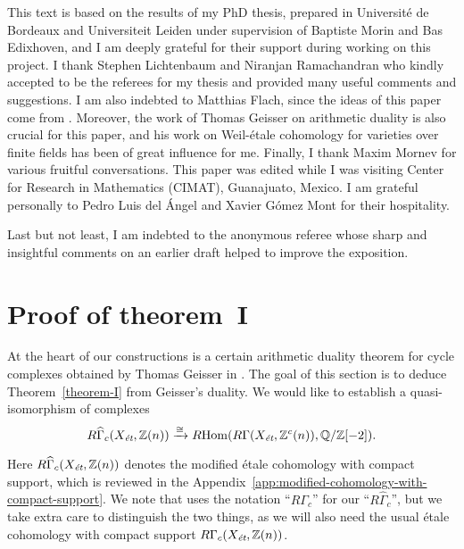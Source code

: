 \documentclass[leqno,12pt]{article}
\theoremstyle{plain}
\theoremstyle{definition}
\DeclareMathOperator{\Hom}{Hom}
\newcommand{\QQ}{\mathbb{Q}}
\newcommand{\ZZ}{\mathbb{Z}}
\newcommand{\et}{\text{\it \'{e}t}}
\newcommand{\RHom}{R\!\Hom}
\begin{document}
This text is based on the results of my PhD thesis, prepared in Universit\'{e}
de Bordeaux and Universiteit Leiden under supervision of Baptiste Morin and
Bas Edixhoven, and I am deeply grateful for their support during working on this
project. I thank Stephen Lichtenbaum and Niranjan Ramachandran who kindly
accepted to be the referees for my thesis and provided many useful comments and
suggestions. I am also indebted to Matthias Flach, since the ideas of this paper
come from \cite{Flach-Morin-2018}. Moreover, the work of Thomas Geisser on
arithmetic duality \cite{Geisser-2010} is also crucial for this paper, and his
work on Weil-\'{e}tale cohomology for varieties over finite fields
\cite{Geisser-2004,Geisser-2006,Geisser-2010-arithmetic-homology} has been of
great influence for me. Finally, I thank Maxim Mornev for various fruitful
conversations. This paper was edited while I was visiting Center for Research in
Mathematics (CIMAT), Guanajuato, Mexico. I am grateful personally to Pedro Luis
del \'{A}ngel and Xavier G\'{o}mez Mont for their hospitality.

Last but not least, I am indebted to the anonymous referee whose sharp and
insightful comments on an earlier draft helped to improve the exposition.


\section{Proof of theorem~I}
\label{sec:arithmetic-duality-theorem}

At the heart of our constructions is a certain arithmetic duality theorem for
cycle complexes obtained by Thomas Geisser in \cite{Geisser-2010}. The goal of
this section is to deduce Theorem~\ref{theorem-I} from Geisser's duality.
We would like to establish a quasi-isomorphism of complexes
\[ R\widehat{\Gamma}_c (X_\et, \ZZ (n)) \xrightarrow{\cong}
\RHom (R\Gamma (X_\et, \ZZ^c (n)), \QQ/\ZZ [-2]). \]

Here $R\widehat{\Gamma}_c (X_\et, \ZZ (n))$ denotes the modified \'{e}tale
cohomology with compact support, which is reviewed in the
Appendix~\ref{app:modified-cohomology-with-compact-support}. We note that
\cite{Geisser-2010} uses the notation ``$R\Gamma_c$'' for our
``$R\widehat{\Gamma}_c$'', but we take extra care to distinguish the two things,
as we will also need the usual \'{e}tale cohomology with compact support
$R\Gamma_c (X_\et, \ZZ (n))$.
\end{document}
